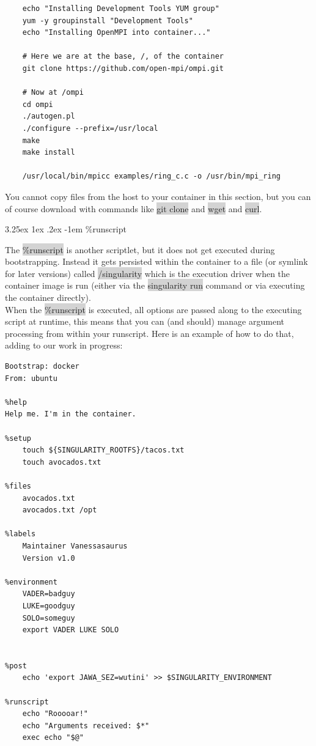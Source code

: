 \documentclass[a4paper]{article}
\makeatletter
\renewcommand\paragraph{\@startsection{paragraph}{5}{\z@}%
  {3.25ex \@plus1ex \@minus.2ex}%
  {-1em}%
  {\normalfont\normalsize\bfseries}}
\makeatother
\begin{document}
\begin{lstlisting}[frame=single]  
%post
    echo "Installing Development Tools YUM group"
    yum -y groupinstall "Development Tools"
    echo "Installing OpenMPI into container..."

    # Here we are at the base, /, of the container
    git clone https://github.com/open-mpi/ompi.git

    # Now at /ompi
    cd ompi
    ./autogen.pl
    ./configure --prefix=/usr/local
    make
    make install

    /usr/local/bin/mpicc examples/ring_c.c -o /usr/bin/mpi_ring
\end{lstlisting}		
		
		You cannot copy files from the host to your container in this section, but you can of course download with commands like \colorbox{lightgray}{git clone} and \colorbox{lightgray}{wget} and \colorbox{lightgray}{curl}.


		\paragraph{\%runscript}
		\label{sec:runscript}
		
The \colorbox{lightgray}{\%runscript} is another scriptlet, but it does not get executed during bootstrapping. Instead it gets persisted within the container to a file (or symlink for later versions) called \colorbox{lightgray}{/singularity} which is the execution driver when the container image is run (either via the \colorbox{lightgray}{singularity run} command or via executing the container directly).\\[0.1in]

When the  \colorbox{lightgray}{\%runscript} is executed, all options are passed along to the executing script at runtime, this means that you can (and should) manage argument processing from within your runscript. Here is an example of how to do that, adding to our work in progress:

\begin{lstlisting}[frame=single]  
Bootstrap: docker
From: ubuntu

%help
Help me. I'm in the container.

%setup
    touch ${SINGULARITY_ROOTFS}/tacos.txt
    touch avocados.txt

%files
    avocados.txt
    avocados.txt /opt    

%labels
    Maintainer Vanessasaurus
    Version v1.0

%environment
    VADER=badguy
    LUKE=goodguy
    SOLO=someguy
    export VADER LUKE SOLO


%post
    echo 'export JAWA_SEZ=wutini' >> $SINGULARITY_ENVIRONMENT

%runscript
    echo "Rooooar!"
    echo "Arguments received: $*"
    exec echo "$@"
\end{lstlisting}
  
\end{document}
